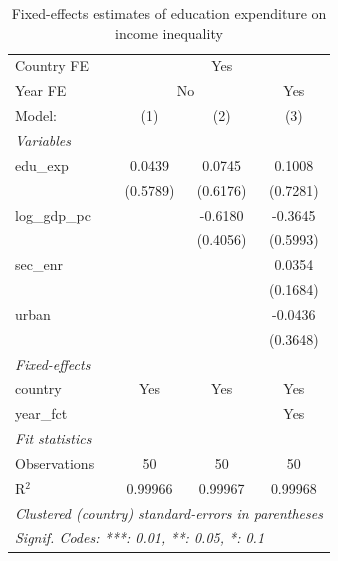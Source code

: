 
\begin{table}[htbp]
   \caption{\label{tab:fe} Fixed-effects estimates of education expenditure on income inequality}
   \centering
   \begin{tabular}{lccc}
      \tabularnewline \midrule \midrule
      Country FE & \multicolumn{3}{c}{Yes} \\ 
      Year FE & \multicolumn{2}{c}{No} & Yes \\ 
      Model:         & (1)      & (2)      & (3)\\  
      \midrule
      \emph{Variables}\\
      edu\_exp       & 0.0439   & 0.0745   & 0.1008\\   
                     & (0.5789) & (0.6176) & (0.7281)\\   
      log\_gdp\_pc   &          & -0.6180  & -0.3645\\   
                     &          & (0.4056) & (0.5993)\\   
      sec\_enr       &          &          & 0.0354\\   
                     &          &          & (0.1684)\\   
      urban          &          &          & -0.0436\\   
                     &          &          & (0.3648)\\   
      \midrule
      \emph{Fixed-effects}\\
      country        & Yes      & Yes      & Yes\\  
      year\_fct      &          &          & Yes\\  
      \midrule
      \emph{Fit statistics}\\
      Observations   & 50       & 50       & 50\\  
      R$^2$          & 0.99966  & 0.99967  & 0.99968\\  
      \midrule \midrule
      \multicolumn{4}{l}{\emph{Clustered (country) standard-errors in parentheses}}\\
      \multicolumn{4}{l}{\emph{Signif. Codes: ***: 0.01, **: 0.05, *: 0.1}}\\
   \end{tabular}
\end{table}



